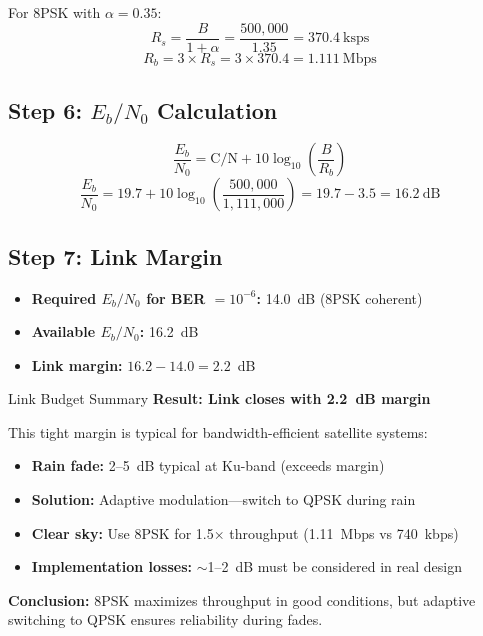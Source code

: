 For 8PSK with $\alpha = 0.35$:
\begin{equation}
R_s = \frac{B}{1 + \alpha} = \frac{500{,}000}{1.35} = 370.4~\mathrm{ksps}
\end{equation}
\begin{equation}
R_b = 3 \times R_s = 3 \times 370.4 = 1.111~\mathrm{Mbps}
\end{equation}

\subsection*{Step 6: $E_b/N_0$ Calculation}

\begin{equation}
\frac{E_b}{N_0} = \mathrm{C/N} + 10\log_{10}\left(\frac{B}{R_b}\right)
\end{equation}
\begin{equation}
\frac{E_b}{N_0} = 19.7 + 10\log_{10}\left(\frac{500{,}000}{1{,}111{,}000}\right) = 19.7 - 3.5 = 16.2~\mathrm{dB}
\end{equation}

\subsection*{Step 7: Link Margin}

\begin{itemize}
\item \textbf{Required $E_b/N_0$ for BER $= 10^{-6}$:} 14.0~dB (8PSK coherent)
\item \textbf{Available $E_b/N_0$:} 16.2~dB
\item \textbf{Link margin:} $16.2 - 14.0 = 2.2$~dB
\end{itemize}

\begin{calloutbox}[colback=black!8!white,colframe=black]{Link Budget Summary}
\textbf{Result: Link closes with 2.2~dB margin}

This tight margin is typical for bandwidth-efficient satellite systems:
\begin{itemize}
\item \textbf{Rain fade:} 2--5~dB typical at Ku-band (exceeds margin)
\item \textbf{Solution:} Adaptive modulation---switch to QPSK during rain
\item \textbf{Clear sky:} Use 8PSK for 1.5$\times$ throughput (1.11~Mbps vs 740~kbps)
\item \textbf{Implementation losses:} $\sim$1--2~dB must be considered in real design
\end{itemize}

\textbf{Conclusion:} 8PSK maximizes throughput in good conditions, but adaptive switching to QPSK ensures reliability during fades.
\end{calloutbox}



